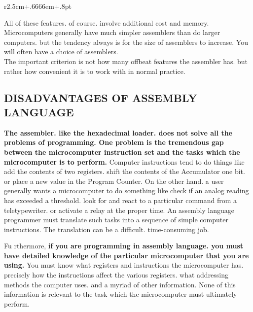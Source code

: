 \documentclass{book}
\begin{document}
\begin{wrapfigure}{r}{2.5cm+.6666em+.8pt}
\end{wrapfigure}
All of these features. of course. involve additional cost and memory. Microcomputers generally have much simpler assemblers than do larger computers. but the tendency always is for the size of assemblers to increase. You will often have a choice of assemblers.\\
The important criterion is not how many offbeat features the assembler has. but rather
how convenient it is to work with in normal practice.

\subsection*{DISADVANTAGES OF ASSEMBLY LANGUAGE}
\textbf{The assembler. like the hexadecimal loader. does not solve all the problems of programming. One problem is the tremendous gap between the microcomputer instruction set and the tasks which the microcomputer is to perform.} Computer instructions tend to do things like add the contents of two registers. shift the contents of the Accumulator one bit. or place a new value in the Program Counter. On the other hand. a user generally wants a microcomputer to do something like check if an analog reading has exceeded a threshold. look for and react to a particular command from a teletypewriter. or activate a relay at the proper time. An assembly language programmer must translate such tasks into a sequence of simple computer instructions. The translation can be a difficult. time-consuming job.

Fu rthermore, \textbf{if you are programming in assembly language. you must have detailed knowledge of the particular microcomputer that you are using.} You must know what registers and instructions the microcomputer has. precisely how the instructions affect the various registers. what addressing methods the computer uses. and a myriad of other information. None of this information is relevant to the task which the microcomputer must ultimately perform.
\end{document}
